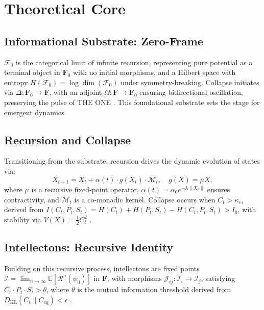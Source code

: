 \documentclass[11pt]{article}
\newcommand{\field}[1]{\mathcal{#1}}
\newcommand{\intellecton}{\mathcal{I}}
\newcommand{\expect}{\mathbb{E}}
\newcommand{\cat}[1]{\mathbf{#1}}
\begin{document}
\section{Theoretical Core}
\label{sec:theory}

\subsection{Informational Substrate: Zero-Frame}
$\field{F}_0$ is the categorical limit of infinite recursion, representing pure potential as a terminal object in $\cat{F}_0$ with no initial morphisms, and a Hilbert space with entropy $H(\field{F}_0) = \log \dim(\field{F}_0)$ under symmetry-breaking. Collapse initiates via $\Delta: \cat{F}_0 \to \cat{F}$, with an adjoint $\Omega: \cat{F} \to \cat{F}_0$ ensuring bidirectional oscillation, preserving the pulse of THE ONE \citep{plotinus2020}. This foundational substrate sets the stage for emergent dynamics.

\subsection{Recursion and Collapse}
Transitioning from the substrate, recursion drives the dynamic evolution of states via:
\begin{equation}
X_{t+1} = X_t + \alpha(t) \cdot g(X_t) \cdot \mathcal{M}_t, \quad g(X) = \mu X,
\label{eq:recursion}
\end{equation}
where $\mu$ is a recursive fixed-point operator, $\alpha(t) = \alpha_0 e^{-\lambda \|X_t\|}$ ensures contractivity, and $\mathcal{M}_t$ is a co-monadic kernel. Collapse occurs when $C_t > \kappa_c$, derived from $I(C_t, P_t, S_t) = H(C_t) + H(P_t, S_t) - H(C_t, P_t, S_t) > I_0$, with stability via $V(X) = \frac{1}{2} C_t^2$ \citep{penrose2024}.

\subsection{Intellectons: Recursive Identity}
Building on this recursive process, intellectons are fixed points $\intellecton = \lim_{n \to \infty} \expect[\mathcal{R}^n(\psi_0)]$ in $\cat{F}$, with morphisms $\mathcal{J}_{ij}: \intellecton_i \to \intellecton_j$, satisfying $C_t \cdot P_t \cdot S_t > \theta$, where $\theta$ is the mutual information threshold derived from $D_{\text{KL}}(C_t \| C_{\text{eq}}) < \epsilon$ \citep{tononi2023}.
\end{document}
